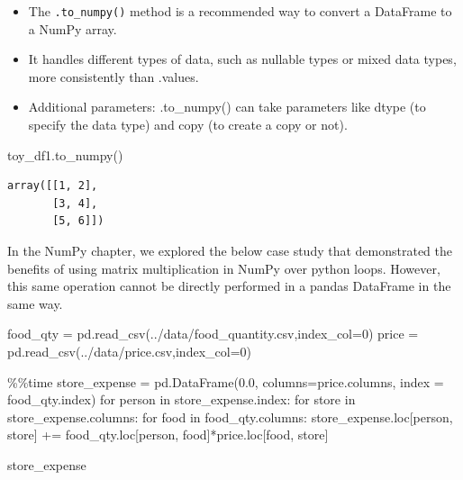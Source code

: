 \documentclass[
  letterpaper,
  DIV=11,
  numbers=noendperiod]{scrreprt}
\newenvironment{Shaded}{\begin{snugshade}}{\end{snugshade}}
\newcommand{\ControlFlowTok}[1]{\textcolor[rgb]{0.00,0.23,0.31}{#1}}
\newcommand{\DecValTok}[1]{\textcolor[rgb]{0.68,0.00,0.00}{#1}}
\newcommand{\FloatTok}[1]{\textcolor[rgb]{0.68,0.00,0.00}{#1}}
\newcommand{\KeywordTok}[1]{\textcolor[rgb]{0.00,0.23,0.31}{#1}}
\newcommand{\NormalTok}[1]{\textcolor[rgb]{0.00,0.23,0.31}{#1}}
\newcommand{\OperatorTok}[1]{\textcolor[rgb]{0.37,0.37,0.37}{#1}}
\newcommand{\StringTok}[1]{\textcolor[rgb]{0.13,0.47,0.30}{#1}}
\providecommand{\tightlist}{%
  \setlength{\itemsep}{0pt}\setlength{\parskip}{0pt}}\usepackage{longtable,booktabs,array}
\begin{document}
\begin{itemize}
\tightlist
\item
  The \texttt{.to\_numpy()} method is a recommended way to convert a
  DataFrame to a NumPy array.
\item
  It handles different types of data, such as nullable types or mixed
  data types, more consistently than .values.
\item
  Additional parameters: .to\_numpy() can take parameters like dtype (to
  specify the data type) and copy (to create a copy or not).
\end{itemize}

\begin{Shaded}
\begin{Highlighting}[]
\NormalTok{toy\_df1.to\_numpy()}
\end{Highlighting}
\end{Shaded}

\begin{verbatim}
array([[1, 2],
       [3, 4],
       [5, 6]])
\end{verbatim}

In the NumPy chapter, we explored the below case study that demonstrated
the benefits of using matrix multiplication in NumPy over python loops.
However, this same operation cannot be directly performed in a pandas
DataFrame in the same way.

\begin{Shaded}
\begin{Highlighting}[]
\NormalTok{food\_qty }\OperatorTok{=}\NormalTok{ pd.read\_csv(}\StringTok{\textquotesingle{}../data/food\_quantity.csv\textquotesingle{}}\NormalTok{,index\_col}\OperatorTok{=}\DecValTok{0}\NormalTok{)}
\NormalTok{price }\OperatorTok{=}\NormalTok{ pd.read\_csv(}\StringTok{\textquotesingle{}../data/price.csv\textquotesingle{}}\NormalTok{,index\_col}\OperatorTok{=}\DecValTok{0}\NormalTok{)}
\end{Highlighting}
\end{Shaded}

\begin{Shaded}
\begin{Highlighting}[]
\OperatorTok{\%\%}\NormalTok{time}
\NormalTok{store\_expense }\OperatorTok{=}\NormalTok{ pd.DataFrame(}\FloatTok{0.0}\NormalTok{, columns}\OperatorTok{=}\NormalTok{price.columns, index }\OperatorTok{=}\NormalTok{ food\_qty.index)}
\ControlFlowTok{for}\NormalTok{ person }\KeywordTok{in}\NormalTok{ store\_expense.index:}
    \ControlFlowTok{for}\NormalTok{ store }\KeywordTok{in}\NormalTok{ store\_expense.columns:}
        \ControlFlowTok{for}\NormalTok{ food }\KeywordTok{in}\NormalTok{ food\_qty.columns:}
\NormalTok{            store\_expense.loc[person, store] }\OperatorTok{+=}\NormalTok{ food\_qty.loc[person, food]}\OperatorTok{*}\NormalTok{price.loc[food, store]}

\NormalTok{store\_expense}
\end{Highlighting}
\end{Shaded}
\end{document}
